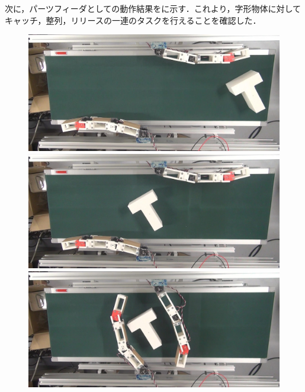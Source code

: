 \documentclass[a4paper,twoside,12pt,papersize, dvipdfmx]{iirthesis}
\begin{document}
次に，パーツフィーダとしての動作結果をに示す．これより，字形物体に対してキャッチ，整列，リリースの一連のタスクを行えることを確認した．
\begin{figure}[hb]
\centering
\begin{minipage}{0.49\hsize}
\includegraphics[width=0.98\hsize]{fig/4-manipulation-result/TShape/3-1.jpg}
\subcaption{}
\end{minipage}\hfill
\begin{minipage}{0.49\hsize}
\includegraphics[width=0.98\hsize]{fig/4-manipulation-result/TShape/3-2.jpg}
\subcaption{}
\end{minipage}\hfill
\begin{minipage}{0.49\hsize}
\includegraphics[width=0.98\hsize]{fig/4-manipulation-result/TShape/3-3.jpg}
\subcaption{}

\end{minipage}
\end{figure}
\end{document}

